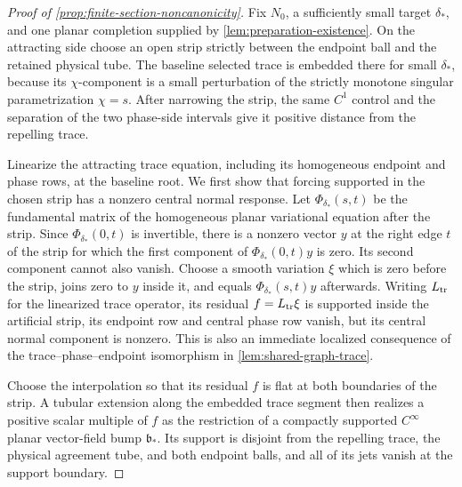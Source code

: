 \begin{proof}[Proof of \cref{prop:finite-section-noncanonicity}]
Fix \(N_0\), a sufficiently small target \(\delta_*\), and one planar
completion supplied by \cref{lem:preparation-existence}.  On the attracting
side choose an open strip strictly between the endpoint ball and the retained
physical tube.  The baseline selected trace is embedded there for small
\(\delta_*\), because its \(\chi\)-component is a small perturbation of the
strictly monotone singular parametrization \(\chi=s\).  After narrowing the
strip, the same \(C^1\) control and the separation of the two phase-side
intervals give it positive distance from the repelling trace.

Linearize the attracting trace equation, including its homogeneous endpoint
and phase rows, at the baseline root.  We first show that forcing supported in
the chosen strip has a nonzero central normal response.  Let
\(\Phi_{\delta_*}(s,t)\) be the fundamental matrix of the homogeneous planar
variational equation after the strip.  Since
\(\Phi_{\delta_*}(0,t)\) is invertible, there is a nonzero vector \(y\) at the
right edge \(t\) of the strip for which the first component of
\(\Phi_{\delta_*}(0,t)y\) is zero.  Its second component cannot also vanish.
Choose a smooth variation \(\xi\) which is zero before the strip, joins zero
to \(y\) inside it, and equals
\(\Phi_{\delta_*}(s,t)y\) afterwards.  Writing \(L_{\rm tr}\) for the
linearized trace operator, its residual \(f=L_{\rm tr}\xi\) is supported
inside the artificial strip, its endpoint row and central phase row vanish,
but its central normal component is nonzero.  This is also an immediate
localized consequence of the trace--phase--endpoint isomorphism in
\cref{lem:shared-graph-trace}.

Choose the interpolation so that its residual \(f\) is flat at both
boundaries of the strip.  A tubular extension along the embedded trace
segment then realizes a positive scalar multiple of \(f\) as the restriction
of a compactly supported \(C^\infty\) planar vector-field bump
\(\mathfrak b_*\).  Its support is disjoint from the repelling trace, the
physical agreement tube, and both endpoint balls, and all of its jets vanish
at the support boundary.


\end{proof}
